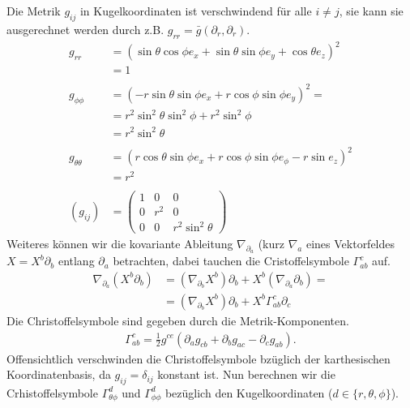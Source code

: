 \documentclass[a4paper]{article}
\begin{document}
Die Metrik $g_{ij}$ in Kugelkoordinaten ist verschwindend für alle
$i\neq j$, sie kann sie ausgerechnet werden durch z.B. $g_{rr}
=\bar{g}(\partial_r, \partial_r)$.
\begin{align}
    g_{rr} &= (\sin\theta\cos\phi e_x  + \sin\theta\sin\phi e_y + \cos\theta e_z)^2\\
    &= 1\\
    \nonumber\\
    g_{\phi\phi} &= (-r\sin\theta\sin\phi e_x + r\cos\phi\sin\phi
    e_y)^2=\\
    &=r^2\sin^2\theta\sin^2\phi + r^2\sin^2\phi \\
    &=r^2 \sin^2\theta\\
    \nonumber\\
    g_{\theta\theta} &= (r\cos\theta\sin\phi e_x + r\cos\phi\sin\phi e_\phi -
    r\sin e_z)^2 \\
    &= r^2\\
    \nonumber\\
    (g_{ij}) &=
    \begin{pmatrix}
        1&0&0\\
        0&r^2&0\\
        0&0&r^2\sin^2\theta
    \end{pmatrix}
\end{align}
Weiteres können wir die kovariante Ableitung $\nabla_{\partial _a}$ (kurz
$\nabla _a$ eines
Vektorfeldes $X = X^b\partial _b$ entlang
$\partial _a$ betrachten, dabei tauchen die Cristoffelsymbole
$\Gamma^c_{ab}$ auf.
\begin{align}
    \nabla_{\partial_a}(X^b\partial _b) &= (\nabla_{\partial_b}X^b)\partial_b
    + X^b(\nabla_{\partial_a}\partial_b) =\\
    &= (\nabla_{\partial_b}X^b)\partial_b + X^b\Gamma^c_{ab} \partial_c
\end{align}
Die Christoffelsymbole sind gegeben durch die Metrik-Komponenten.
\begin{align}
    \Gamma^{c}_{ab} = \frac{1}{2} g^{ce}(\partial_a g_{cb} + \partial_b
    g_{ac} - \partial_c g_{ab}).
\end{align}
Offensichtlich verschwinden die Christoffelsymbole bzüglich der karthesischen
Koordinatenbasis, da $g_{ij} = \delta_{ij}$ konstant ist. Nun berechnen wir
die Crhistoffelsymbole $\Gamma^{d}_{\theta\phi}$ und $\Gamma^{d}_{\phi\phi}$
bezüglich den Kugelkoordinaten ($d \in \{r, \theta, \phi\}$).
\end{document}
